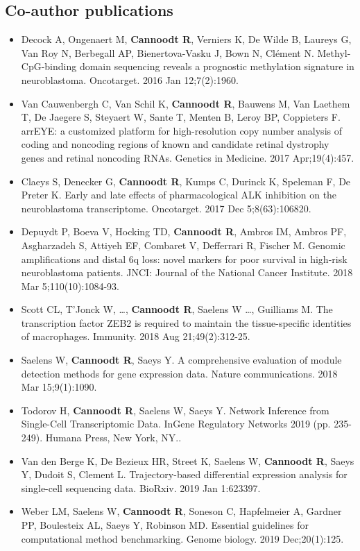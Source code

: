 \subsection{Co-author publications}
\begin{itemize}
	\item Decock A, Ongenaert M, \textbf{Cannoodt R}, Verniers K, De Wilde B, Laureys G, Van Roy N, Berbegall AP, Bienertova-Vasku J, Bown N, Clément N. Methyl-CpG-binding domain sequencing reveals a prognostic methylation signature in neuroblastoma. Oncotarget. 2016 Jan 12;7(2):1960.
	\item Van Cauwenbergh C, Van Schil K, \textbf{Cannoodt R}, Bauwens M, Van Laethem T, De Jaegere S, Steyaert W, Sante T, Menten B, Leroy BP, Coppieters F. arrEYE: a customized platform for high-resolution copy number analysis of coding and noncoding regions of known and candidate retinal dystrophy genes and retinal noncoding RNAs. Genetics in Medicine. 2017 Apr;19(4):457.
	\item Claeys S, Denecker G, \textbf{Cannoodt R}, Kumps C, Durinck K, Speleman F, De Preter K. Early and late effects of pharmacological ALK inhibition on the neuroblastoma transcriptome. Oncotarget. 2017 Dec 5;8(63):106820.
	\item Depuydt P, Boeva V, Hocking TD, \textbf{Cannoodt R}, Ambros IM, Ambros PF, Asgharzadeh S, Attiyeh EF, Combaret V, Defferrari R, Fischer M. Genomic amplifications and distal 6q loss: novel markers for poor survival in high-risk neuroblastoma patients. JNCI: Journal of the National Cancer Institute. 2018 Mar 5;110(10):1084-93.
	\item Scott CL, T'Jonck W, \ldots, \textbf{Cannoodt R}, Saelens W \ldots, Guilliams M. The transcription factor ZEB2 is required to maintain the tissue-specific identities of macrophages. Immunity. 2018 Aug 21;49(2):312-25.
	\item Saelens W, \textbf{Cannoodt R}, Saeys Y. A comprehensive evaluation of module detection methods for gene expression data. Nature communications. 2018 Mar 15;9(1):1090.
	\item Todorov H, \textbf{Cannoodt R}, Saelens W, Saeys Y. Network Inference from Single-Cell Transcriptomic Data. InGene Regulatory Networks 2019 (pp. 235-249). Humana Press, New York, NY..
	\item Van den Berge K, De Bezieux HR, Street K, Saelens W, \textbf{Cannoodt R}, Saeys Y, Dudoit S, Clement L. Trajectory-based differential expression analysis for single-cell sequencing data. BioRxiv. 2019 Jan 1:623397.
	\item Weber LM, Saelens W, \textbf{Cannoodt R}, Soneson C, Hapfelmeier A, Gardner PP, Boulesteix AL, Saeys Y, Robinson MD. Essential guidelines for computational method benchmarking. Genome biology. 2019 Dec;20(1):125.
\end{itemize}

